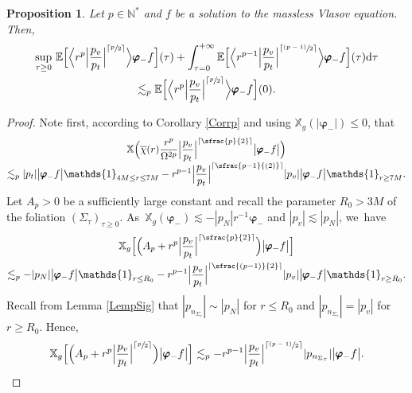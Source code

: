 \documentclass[10pt]{amsart}
\newcommand{\psfrac}[2]{\sfrac{(#1)}{#2}}
\newcommand{\spfrac}[2]{\sfrac{#1}{(#2)}}
\theoremstyle{plain}
\newtheorem{proposition}{Proposition}[section]
\theoremstyle{definition}
\newcommand\T{{\mathbb{X}}}
\newcommand\dr{{\mathrm{d}}}
\begin{document}
\begin{proposition}\label{ProILEDrp}
Let $p \in \mathbb{N}^*$ and $f$ be a solution to the massless Vlasov equation. Then,
\begin{multline*}
\sup_{\tau \geq 0}\, \mathbb{E}\Bigl[ \Big\langle r^{p} \Big|\frac{p_v}{p_t}\Big|^{\lceil \sfrac{p}{2} \rceil} \Big\rangle \pmb{\varphi}_- f \Bigr] (\tau)+\int_{\tau=0}^{+\infty} \mathbb{E}\Bigl[ \Big\langle r^{p-1} \Big|\frac{p_v}{p_t}\Big|^{\lceil \psfrac{p-1}{2} \rceil} \Big\rangle \pmb{\varphi}_- f \Bigr] (\tau) \dr \tau \\
\lesssim_p \mathbb{E}\Bigl[ \Big\langle r^{p} \Big|\frac{p_v}{p_t}\Big|^{\lceil \sfrac{p}{2} \rceil} \Big\rangle \pmb{\varphi}_- f \Bigr] (0).
\end{multline*}
\end{proposition}
\begin{proof}
Note first, according to Corollary \ref{Corrp} and using $\T_g (|\pmb{\varphi}_-|) \leq 0$, that
\begin{multline*}
\T \Bigl(\overline{\chi}(r) \frac{ r^{p}}{\Omega^{2p}} \Big|\frac{p_v}{p_t}\Big|^{\lceil \sfrac{p}{2} \rceil} \big| \pmb{\varphi}_- f \big| \Bigr)\\[-3pt]\lesssim_p |p_t|\big| \pmb{\varphi}_- f \big| \mathds{1}_{4M \leq r \leq 7M}- r^{p-1} \Big|\frac{p_v}{p_t}\Big|^{\lceil \spfrac{p-1}{2} \rceil}|p_v|\big| \pmb{\varphi}_- f \big| \mathds{1}_{r \geq 7M}.
\end{multline*}
Let $A_p>0$ be a sufficiently large constant and recall the parameter $R_0 > 3M$ of the foliation $(\Sigma_\tau)_{\tau \geq 0}$. As~$\T_g (\pmb{\varphi}_-) \lesssim -|p_N|r^{-1}\pmb{\varphi}_-$ and $|p_v| \lesssim |p_N|$, we~have
\begin{multline*}
\T_g \Bigl[ \Bigl(A_p+ r^{p} \Big|\frac{p_v}{p_t}\Big|^{\lceil \sfrac{p}{2} \rceil} \Bigr) \big| \pmb{\varphi}_- f \big| \Bigr]\\
\lesssim_p -|p_N|\big| \pmb{\varphi}_- f \big| \mathds{1}_{r \leq R_0}- r^{p-1} \Big|\frac{p_v}{p_t}\Big|^{\lceil \psfrac{p-1}{2} \rceil}|p_v|\big| \pmb{\varphi}_- f \big| \mathds{1}_{r \geq R_0}.
\end{multline*}
Recall from Lemma \ref{LempSig} that $|p_{n_{\Sigma_\tau}}| \sim |p_N|$ for $r \leq R_0$ and $|p_{n_{\Sigma_\tau}}| =|p_v|$ for $r \geq R_0$. Hence,
\[
\T_g \Bigl[ \Bigl(A_p+ r^{p} \Big|\frac{p_v}{p_t}\Big|^{\lceil \sfrac{p}{2} \rceil} \Bigr) \big| \pmb{\varphi}_- f \big| \Bigr] \lesssim_p -r^{p-1} \Big|\frac{p_v}{p_t}\Big|^{\lceil \psfrac{p-1}{2} \rceil}|p_{n_{\Sigma_\tau}}|\big| \pmb{\varphi}_- f \big|.
\]
\end{proof}
\end{document}
